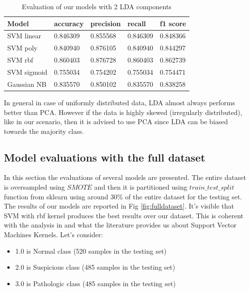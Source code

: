 \documentclass[a4paper,12pt]{article}
\begin{document}
\begin{table}[H]
\begin{tabular}{ |p{6cm}||p{2cm}|p{2cm}|p{2cm}|p{2cm}| }
  \hline
  Model& accuracy & precision  &  recall & f1 score \\
  \hline
  SVM linear           &0.846309&   0.855568&  0.846309&  0.848366\\
  SVM poly             &0.840940&   0.876105&  0.840940&  0.844297\\
  SVM rbf              &0.860403&   0.876728&  0.860403&  0.862739\\
  SVM sigmoid          &0.755034&   0.754202&  0.755034&  0.754471\\
  Gaussian NB          &0.835570&   0.850102&  0.835570&  0.838258\\
  \hline
\end{tabular}
\caption{Evaluation of our models with 2 LDA components}
\label{tab:lda2}
\end{table}


\noindent In general in case of uniformly distributed data, LDA almost always performs better than PCA. However if the data is highly skewed (irregularly distributed), like in our scenario, then it is advised to use PCA since LDA can be biased towards the majority class. \cite{pca-lda}

\newpage
\subsection{Model evaluations with the full dataset}

In this section the evaluations of several models are presented. The entire dataset is oversampled using $SMOTE$ and then it is partitioned using $train\_test\_split$ function from sklearn using around 30\% of the entire dataset for the testing set. 
The results of our models are reported in Fig \ref{fig:fulldataset}. It's visible that SVM with rbf kernel produces the best results over our dataset. This is coherent with the analysis in \cite{ml} and what the literature provides us about Support Vector Machines Kernels. Let's consider:
\bigbreak
\begin{itemize}
  \item 1.0 is Normal class (520 samples in the testing set)
  \item 2.0 is Suspicious class (485 samples in the testing set)
  \item 3.0 is Pathologic class (485 samples in the testing set)
\end{itemize} 
\end{document}
